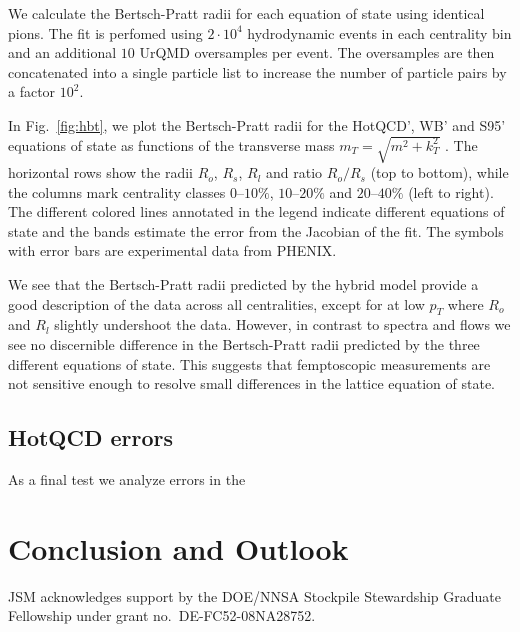 \documentclass[aps,prc,reprint,amsmath,nofootinbib,superscriptaddress]{revtex4-1}
\begin{document}
We calculate the Bertsch-Pratt radii for each equation of state using identical pions. The fit is perfomed using $2\cdot10^4$ hydrodynamic events in each centrality bin and an additional $10$ UrQMD oversamples per event. 
The oversamples are then concatenated into a single particle list to increase the number of particle pairs by a factor $10^2$.

In Fig.~\ref{fig:hbt}, we plot the Bertsch-Pratt radii for the HotQCD', WB' and S95' equations of state as functions of the transverse mass $m_T = \sqrt{m^2 + k_T^2}$ . The horizontal rows show the radii $R_o$, $R_s$, $R_l$ and ratio $R_o/R_s$ (top to bottom), while the columns 
mark centrality classes $0$--$10\%$, $10$--$20\%$ and $20$--$40\%$ (left to right). The different colored lines annotated in the legend indicate different equations of state and the bands estimate the error from the Jacobian 
of the fit. The symbols with error bars are experimental data from PHENIX.

We see that the Bertsch-Pratt radii predicted by the hybrid model provide a good description of the data across all centralities, except for at low $p_T$ where $R_o$ and $R_l$ slightly undershoot the data. However, in contrast to
spectra and flows we see no discernible difference in the Bertsch-Pratt radii predicted by the three different equations of state. This suggests that femptoscopic measurements are not sensitive enough to resolve small differences
in the lattice equation of state.
 
\subsection{HotQCD errors}
\label{errors}

As a final test we analyze errors in the 

\section{Conclusion and Outlook}

\begin{acknowledgments}
 JSM acknowledges support by the DOE/NNSA Stockpile Stewardship Graduate Fellowship under grant no.~DE-FC52-08NA28752.
\end{acknowledgments}


\end{document}
